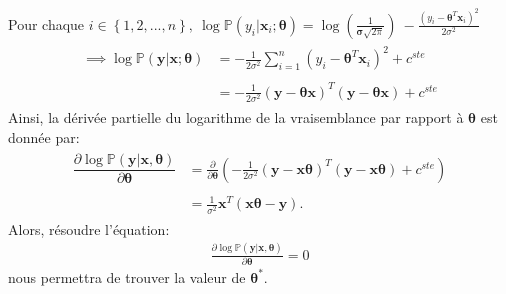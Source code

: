 \documentclass[letterpaper,11pt,english]{sphinxmanual}
\begin{document}
\begin{itemize}
\sphinxAtStartPar
Pour chaque
\(i \in \left\lbrace 1, 2, ..., n\right\rbrace ,~\log \mathbb{P} (y_i| \mathbf{x}_i; \boldsymbol{\theta}) =\log\left(\frac{1}{\boldsymbol{\sigma} \sqrt{2\pi}}\right)~ -\frac{\left(y_i - \boldsymbol{\theta}^T \mathbf{x}_i\right)^2}{2 \sigma^2}\)
\begin{equation}\label{equation:chapter3:chapter3:4}
\begin{split}\begin{aligned}
\implies \log \mathbb{P} (\mathbf{y}| \mathbf{x}; \boldsymbol{\theta}) &= -\frac{1}{2 \sigma^2} \sum_{i=1}^{n}(y_i - \boldsymbol{\theta}^T \mathbf{x}_i)^2 +c^{ste}
\\
\\
&= -\frac{1}{2 \sigma^2} (\mathbf{y} - \boldsymbol{\theta} \mathbf{x})^T (\mathbf{y} - \boldsymbol{\theta} \mathbf{x}) + c^{ste}\end{aligned}\end{split}
\end{equation}
\sphinxAtStartPar
Ainsi, la dérivée partielle du logarithme de la vraisemblance par
rapport à \(\boldsymbol{\theta}\) est donnée par:
\begin{equation}\label{equation:chapter3:chapter3:5}
\begin{split}\begin{aligned}
\dfrac{\partial \log \mathbb{P} (\mathbf{y}| \mathbf{x}, \boldsymbol{\theta})}{\partial \boldsymbol{\theta}} & = \frac{\partial}{\partial \boldsymbol{\theta}} \left( -\frac{1}{2 \sigma^2} (\mathbf{y} - \mathbf{x} \boldsymbol{\theta})^T (\mathbf{y} - \mathbf{x} \boldsymbol{\theta} ) + c^{ste} \right)
\\
\\
& = \frac{1}{\sigma^2} \mathbf{x}^T(\mathbf{x}\boldsymbol{\theta} - \mathbf{y}).\end{aligned}\end{split}
\end{equation}
\sphinxAtStartPar
Alors, résoudre l’équation:
\begin{equation}\label{equation:chapter3:chapter3:6}
\begin{split}\displaystyle \frac{\partial \log \mathbb{P}(\mathbf{y}| \mathbf{x}, \boldsymbol{\theta})}{\partial \boldsymbol{\theta}} = 0\end{split}
\end{equation}
\sphinxAtStartPar
nous permettra de trouver la valeur de \(\boldsymbol{\theta}^*\).
\begin{equation}\label{equation:chapter3:chapter3:7}

\end{equation}
\end{itemize}
\end{document}
